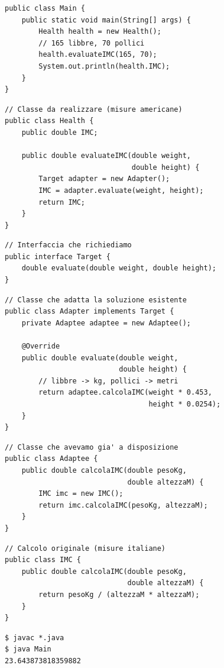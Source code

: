\noindent\begin{minipage}[t]{0.49\textwidth}
\begin{lstlisting}[style=java, name=Main.java]
public class Main {
    public static void main(String[] args) {
        Health health = new Health();
        // 165 libbre, 70 pollici
        health.evaluateIMC(165, 70);
        System.out.println(health.IMC);
    }
}
\end{lstlisting}
\begin{lstlisting}[style=java, name=Health.java]
// Classe da realizzare (misure americane)
public class Health {
    public double IMC;

    public double evaluateIMC(double weight,
                              double height) {
        Target adapter = new Adapter();
        IMC = adapter.evaluate(weight, height);
        return IMC;
    }
}
\end{lstlisting}
\begin{lstlisting}[style=java, name=Target.java]
// Interfaccia che richiediamo
public interface Target {
    double evaluate(double weight, double height);
}
\end{lstlisting}
\end{minipage}\hfill
\begin{minipage}[t]{0.49\textwidth}
\begin{lstlisting}[style=java, name=Adapter.java]
// Classe che adatta la soluzione esistente
public class Adapter implements Target {
    private Adaptee adaptee = new Adaptee();

    @Override
    public double evaluate(double weight,
                           double height) {
        // libbre -> kg, pollici -> metri
        return adaptee.calcolaIMC(weight * 0.453,
                                  height * 0.0254);
    }
}
\end{lstlisting}
\begin{lstlisting}[style=java, name=Adaptee.java]
// Classe che avevamo gia' a disposizione
public class Adaptee {
    public double calcolaIMC(double pesoKg,
                             double altezzaM) {
        IMC imc = new IMC();
        return imc.calcolaIMC(pesoKg, altezzaM);
    }
}
\end{lstlisting}
\begin{lstlisting}[style=java, name=IMC.java]
// Calcolo originale (misure italiane)
public class IMC {
    public double calcolaIMC(double pesoKg,
                             double altezzaM) {
        return pesoKg / (altezzaM * altezzaM);
    }
}
\end{lstlisting}
\begin{lstlisting}[style=shell, name=Terminale]
$ javac *.java
$ java Main
23.643873818359882
\end{lstlisting}
\end{minipage}

